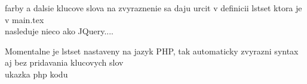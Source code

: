 farby a dalsie klucove slova na zvyraznenie sa daju urcit v definicii lstset ktora je v  main.tex \\
nasleduje nieco ako JQuery....


Momentalne je lstset nastaveny na jazyk PHP, tak automaticky zvyrazni syntax aj bez pridavania klucovych slov \\
ukazka php kodu
